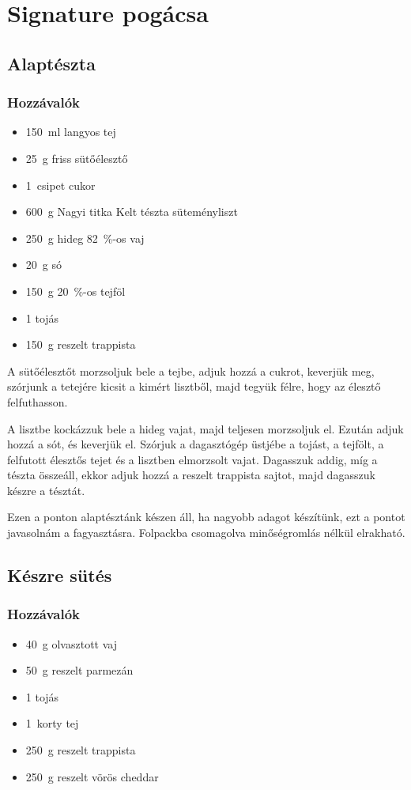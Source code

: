\section*{Signature pogácsa}

\subsection*{Alaptészta}
\subsubsection*{Hozzávalók}
\begin{itemize}
    \item \qty{150}{\ml} langyos tej
    \item \qty{25}{\g} friss sütőélesztő
    \item \qty{1}{csipet} cukor
    \item \qty{600}{\g} Nagyi titka Kelt tészta süteményliszt
    \item \qty{250}{\g} hideg \qty{82}{\percent}-os vaj
    \item \qty{20}{\g} só
    \item \qty{150}{g} \qty{20}{\percent}-os tejföl
    \item \num{1} tojás
    \item \qty{150}{\g} reszelt trappista
\end{itemize}
A sütőélesztőt morzsoljuk bele a tejbe, adjuk hozzá a cukrot, keverjük meg, szórjunk a tetejére kicsit a kimért lisztből, majd tegyük félre, hogy az élesztő felfuthasson.

A lisztbe kockázzuk bele a hideg vajat, majd teljesen morzsoljuk el. Ezután adjuk hozzá a sót, és keverjük el. Szórjuk a dagasztógép üstjébe a tojást, a tejfölt, a felfutott élesztős tejet és a lisztben elmorzsolt vajat. Dagasszuk addig, míg a tészta összeáll, ekkor adjuk hozzá a reszelt trappista sajtot, majd dagasszuk készre a tésztát.

Ezen a ponton alaptésztánk készen áll, ha nagyobb adagot készítünk, ezt a pontot javasolnám a fagyasztásra. Folpackba csomagolva minőségromlás nélkül elrakható.

\subsection*{Készre sütés}
\subsubsection*{Hozzávalók}
\begin{itemize}
    \item \qty{40}{\g} olvasztott vaj
    \item \qty{50}{\g} reszelt parmezán
    \item \num{1} tojás
    \item \qty{1}{korty} tej
    \item \qty{250}{\g} reszelt trappista
    \item \qty{250}{\g} reszelt vörös cheddar
\end{itemize}

